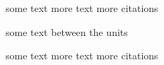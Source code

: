 \documentclass{article}
\begin{document}
\begin{bibunit}
some text \cite{Betan:02} more text more citations
\putbib
\end{bibunit}
some text between the units
\begin{bibunit}
some text \cite{Dussel:09} more text more citations
\putbib
\end{bibunit}
\end{document}
